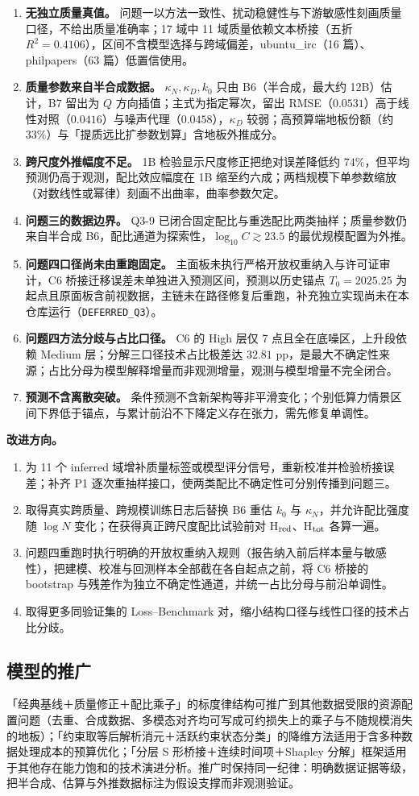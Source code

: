 \begin{enumerate}
\item \textbf{无独立质量真值。} 问题一以方法一致性、扰动稳健性与下游敏感性刻画质量口径，不给出质量准确率；17 域中 11 域质量依赖文本桥接（五折 $R^2=0.4106$），区间不含模型选择与跨域偏差，ubuntu\_irc（16 篇）、philpapers（63 篇）低置信使用。
\item \textbf{质量参数来自半合成数据。} $\kappa_N,\kappa_D,k_0$ 只由 B6（半合成，最大约 12B）估计，B7 留出为 $Q$ 方向插值；主式为指定幂次，留出 RMSE（$0.0531$）高于线性对照（$0.0416$）与噪声代理（$0.0458$），$\kappa_D$ 较弱；高预算端地板份额（约 $33\%$）与「提质远比扩参数划算」含地板外推成分。
\item \textbf{跨尺度外推幅度不足。} 1B 检验显示尺度修正把绝对误差降低约 $74\%$，但平均预测仍高于观测，配比效应幅度在 1B 缩至约六成；两档规模下单参数缩放（对数线性或幂律）刻画不出曲率，曲率参数欠定。
\item \textbf{问题三的数据边界。} Q3-9 已闭合固定配比与重选配比两类抽样；质量参数仍来自半合成 B6，配比通道为探索性，$\log_{10}C\gtrsim23.5$ 的最优规模配置为外推。
\item \textbf{问题四口径尚未由重跑固定。} 主面板未执行严格开放权重纳入与许可证审计，C6 桥接迁移误差未单独进入预测区间，预测以历史锚点 $T_0=2025.25$ 为起点且原面板含前视数据，主链未在路径修复后重跑，补充独立实现尚未在本仓库运行（\texttt{DEFERRED\_Q3}）。
\item \textbf{问题四方法分歧与占比口径。} C6 的 High 层仅 7 点且全在底噪区，上升段依赖 Medium 层；分解三口径技术占比极差达 $32.81$ pp，是最大不确定性来源；占比分母为模型解释增量而非观测增量，观测与模型增量不完全闭合。
\item \textbf{预测不含离散突破。} 条件预测不含新架构等非平滑变化；个别低算力情景区间下界低于锚点，与累计前沿不下降定义存在张力，需先修复单调性。
\end{enumerate}

\textbf{改进方向。}
\begin{enumerate}
\item 为 11 个 inferred 域增补质量标签或模型评分信号，重新校准并检验桥接误差；补齐 P1 逐次重抽样接口，使两类配比不确定性可分别传播到问题三。
\item 取得真实跨质量、跨规模训练日志后替换 B6 重估 $k_0$ 与 $\kappa_N$，并允许配比强度随 $\log N$ 变化；在获得真正跨尺度配比试验前对 H$_{\rm red}$、H$_{\rm tot}$ 各算一遍。
\item 问题四重跑时执行明确的开放权重纳入规则（报告纳入前后样本量与敏感性），把建模、校准与回测样本全部截在各自起点之前，将 C6 桥接的 bootstrap 与残差作为独立不确定性通道，并统一占比分母与前沿单调性。
\item 取得更多同验证集的 Loss–Benchmark 对，缩小结构口径与线性口径的技术占比分歧。
\end{enumerate}

\subsection{模型的推广}
\label{sec:7.3}

「经典基线＋质量修正＋配比乘子」的标度律结构可推广到其他数据受限的资源配置问题（去重、合成数据、多模态对齐均可写成可约损失上的乘子与不随规模消失的地板）；「约束取等后解析消元＋活跃约束状态分类」的降维方法适用于含多种数据处理成本的预算优化；「分层 S 形桥接＋连续时间项＋Shapley 分解」框架适用于其他存在能力饱和的技术演进分析。推广时保持同一纪律：明确数据证据等级，把半合成、估算与外推数据标注为假设支撑而非观测验证。
